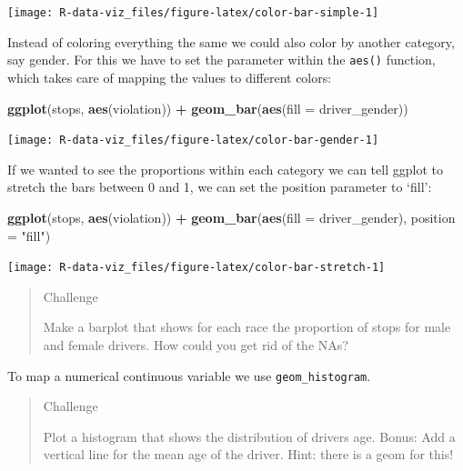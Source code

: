 \documentclass[]{book}
\newenvironment{Shaded}{\begin{snugshade}}{\end{snugshade}}
\newcommand{\KeywordTok}[1]{\textcolor[rgb]{0.13,0.29,0.53}{\textbf{#1}}}
\newcommand{\DataTypeTok}[1]{\textcolor[rgb]{0.13,0.29,0.53}{#1}}
\newcommand{\StringTok}[1]{\textcolor[rgb]{0.31,0.60,0.02}{#1}}
\newcommand{\OperatorTok}[1]{\textcolor[rgb]{0.81,0.36,0.00}{\textbf{#1}}}
\newcommand{\NormalTok}[1]{#1}
\theoremstyle{definition}
\theoremstyle{definition}
\theoremstyle{definition}
\theoremstyle{remark}
\begin{document}
\texttt{[image: R-data-viz\_files/figure-latex/color-bar-simple-1]}

Instead of coloring everything the same we could also color by another
category, say gender. For this we have to set the parameter within the
\texttt{aes()} function, which takes care of mapping the values to
different colors:

\begin{Shaded}
\begin{Highlighting}[]
\KeywordTok{ggplot}\NormalTok{(stops, }\KeywordTok{aes}\NormalTok{(violation)) }\OperatorTok{+}\StringTok{ }
\StringTok{  }\KeywordTok{geom_bar}\NormalTok{(}\KeywordTok{aes}\NormalTok{(}\DataTypeTok{fill =}\NormalTok{ driver_gender))}
\end{Highlighting}
\end{Shaded}

\texttt{[image: R-data-viz\_files/figure-latex/color-bar-gender-1]}

If we wanted to see the proportions within each category we can tell
ggplot to stretch the bars between 0 and 1, we can set the position
parameter to `fill':

\begin{Shaded}
\begin{Highlighting}[]
\KeywordTok{ggplot}\NormalTok{(stops, }\KeywordTok{aes}\NormalTok{(violation)) }\OperatorTok{+}\StringTok{ }
\StringTok{  }\KeywordTok{geom_bar}\NormalTok{(}\KeywordTok{aes}\NormalTok{(}\DataTypeTok{fill =}\NormalTok{ driver_gender), }\DataTypeTok{position =} \StringTok{"fill"}\NormalTok{)}
\end{Highlighting}
\end{Shaded}

\texttt{[image: R-data-viz\_files/figure-latex/color-bar-stretch-1]}

\begin{quote}
Challenge

Make a barplot that shows for each race the proportion of stops for male
and female drivers. How could you get rid of the NAs?
\end{quote}

To map a numerical continuous variable we use \texttt{geom\_histogram}.

\begin{quote}
Challenge

Plot a histogram that shows the distribution of drivers age. Bonus: Add
a vertical line for the mean age of the driver. Hint: there is a geom
for this!
\end{quote}
\end{document}
